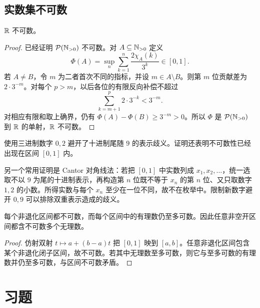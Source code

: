 \subsection{实数集不可数}


\begin{theorem}
\(\mathbb{R}\) 不可数。
\end{theorem}

\begin{proof}
已经证明 \(\mathcal P(\mathbb{N}_{>0})\) 不可数。对 \(A\subseteq\mathbb{N}_{>0}\) 定义
\[
 \Phi(A)=\sup_n\sum_{k=1}^n\frac{2\chi_A(k)}{3^k}\in[0,1].
\]
若 \(A\ne B\)，令 \(m\) 为二者首次不同的指标，并设 \(m\in A\setminus B\)。则第 \(m\) 位贡献差为 \(2\cdot3^{-m}\)。对每个 \(p>m\)，以后各位的有限反向补偿不超过
\[
 \sum_{k=m+1}^{p}2\cdot3^{-k}<3^{-m}.
\]
对相应有限和取上确界，仍有 \(\Phi(A)-\Phi(B)\ge3^{-m}>0\)。所以 \(\Phi\) 是 \(\mathcal P(\mathbb{N}_{>0})\) 到 \(\mathbb{R}\) 的单射，\(\mathbb{R}\) 不可数。
\end{proof}

使用三进制数字 \(0,2\) 避开了十进制尾随 \(9\) 的表示歧义。证明还表明不可数性已经出现在区间 \([0,1]\) 内。

另一个常用证明是 Cantor 对角线法：若把 \([0,1]\) 中实数列成 \(x_1,x_2,\ldots\)，统一选取不以 \(9\) 为尾的十进制表示，再构造第 \(n\) 位既不等于 \(x_n\) 的第 \(n\) 位、又只取数字 \(1,2\) 的小数。所得实数与每个 \(x_n\) 至少在一位不同，故不在枚举中。限制新数字避开 \(0,9\) 可以排除双重表示造成的歧义。

\begin{corollary}
每个非退化区间都不可数，而每个区间中的有理数仍至多可数。因此任意非空开区间都含不可数多个无理数。
\end{corollary}

\begin{proof}
仿射双射 \(t\mapsto a+(b-a)t\) 把 \([0,1]\) 映到 \([a,b]\)。任意非退化区间包含某个非退化闭子区间，故不可数。若其中无理数至多可数，则它与至多可数的有理数并仍至多可数，与区间不可数矛盾。
\end{proof}

\section*{习题}

